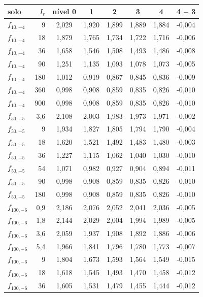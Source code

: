 \begin{tabular}{lr|ccccc|c}
\toprule
solo & $I_r$ & nível 0 & 1 & 2 & 3 & 4 & 4 $-$ 3\\
\midrule
$f_{10,-4}$ & 9 & 2{,}029 & 1{,}920 & 1{,}899 & 1{,}889 & 1{,}884 & -0{,}004\\
$f_{10,-4}$ & 18 & 1{,}879 & 1{,}765 & 1{,}734 & 1{,}722 & 1{,}716 & -0{,}006\\
$f_{10,-4}$ & 36 & 1{,}658 & 1{,}546 & 1{,}508 & 1{,}493 & 1{,}486 & -0{,}008\\
$f_{10,-4}$ & 90 & 1{,}251 & 1{,}135 & 1{,}093 & 1{,}078 & 1{,}073 & -0{,}005\\
$f_{10,-4}$ & 180 & 1{,}012 & 0{,}919 & 0{,}867 & 0{,}845 & 0{,}836 & -0{,}009\\
$f_{10,-4}$ & 360 & 0{,}998 & 0{,}908 & 0{,}859 & 0{,}835 & 0{,}826 & -0{,}010\\
$f_{10,-4}$ & 900 & 0{,}998 & 0{,}908 & 0{,}859 & 0{,}835 & 0{,}826 & -0{,}010\\
$f_{50,-5}$ & 3{,}6 & 2{,}108 & 2{,}003 & 1{,}983 & 1{,}973 & 1{,}971 & -0{,}002\\
$f_{50,-5}$ & 9 & 1{,}934 & 1{,}827 & 1{,}805 & 1{,}794 & 1{,}790 & -0{,}004\\
$f_{50,-5}$ & 18 & 1{,}620 & 1{,}521 & 1{,}492 & 1{,}483 & 1{,}480 & -0{,}003\\
$f_{50,-5}$ & 36 & 1{,}227 & 1{,}115 & 1{,}062 & 1{,}040 & 1{,}030 & -0{,}010\\
$f_{50,-5}$ & 54 & 1{,}071 & 0{,}982 & 0{,}927 & 0{,}904 & 0{,}894 & -0{,}011\\
$f_{50,-5}$ & 90 & 0{,}998 & 0{,}908 & 0{,}859 & 0{,}835 & 0{,}826 & -0{,}010\\
$f_{50,-5}$ & 180 & 0{,}998 & 0{,}908 & 0{,}859 & 0{,}835 & 0{,}826 & -0{,}010\\
$f_{100,-6}$ & 0{,}9 & 2{,}186 & 2{,}076 & 2{,}052 & 2{,}041 & 2{,}036 & -0{,}005\\
$f_{100,-6}$ & 1{,}8 & 2{,}144 & 2{,}029 & 2{,}004 & 1{,}994 & 1{,}989 & -0{,}005\\
$f_{100,-6}$ & 3{,}6 & 2{,}059 & 1{,}937 & 1{,}908 & 1{,}892 & 1{,}886 & -0{,}006\\
$f_{100,-6}$ & 5{,}4 & 1{,}966 & 1{,}841 & 1{,}796 & 1{,}780 & 1{,}773 & -0{,}007\\
$f_{100,-6}$ & 9 & 1{,}804 & 1{,}673 & 1{,}593 & 1{,}564 & 1{,}549 & -0{,}015\\
$f_{100,-6}$ & 18 & 1{,}618 & 1{,}545 & 1{,}493 & 1{,}470 & 1{,}458 & -0{,}012\\
$f_{100,-6}$ & 36 & 1{,}605 & 1{,}531 & 1{,}479 & 1{,}455 & 1{,}444 & -0{,}012\\
\bottomrule
\end{tabular}
